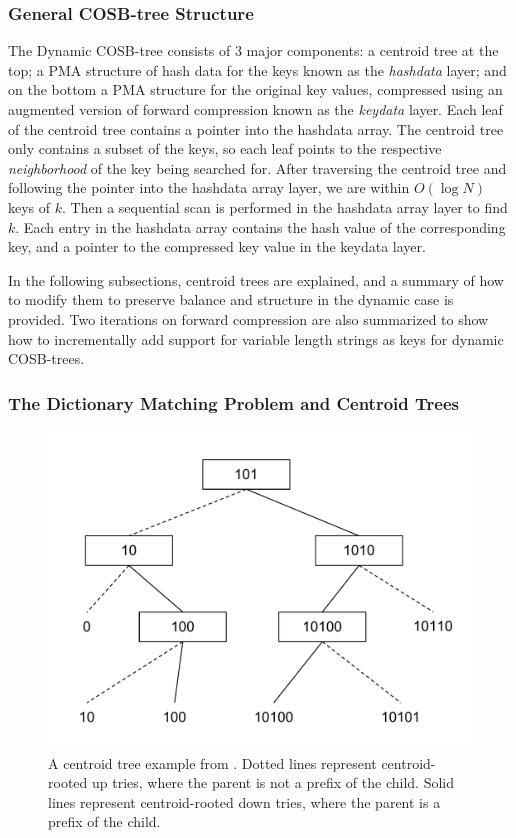 \documentclass{style}
\begin{document}
\subsubsection{General COSB-tree Structure}

The Dynamic COSB-tree consists of 3 major components: a centroid tree at the
top; a PMA structure of hash data for the keys known as
the \emph{hashdata} layer; and on the bottom a PMA structure for the original
key values, compressed using an augmented version of forward compression known as the \emph{keydata} layer. Each leaf of the centroid tree contains a pointer into the hashdata array. The centroid tree only contains a subset of the keys, so each leaf points to the respective \emph{neighborhood} of the key being searched for. After traversing the centroid tree and following the pointer into the hashdata array layer, we are within $O(\log{}N)$ keys of $k$. Then a sequential scan is performed in the hashdata array layer to find $k$. Each entry in the hashdata array contains the hash value of the corresponding key, and a pointer to the compressed key value in the keydata layer.

In the following subsections, centroid trees are explained, and a summary of
how to modify them to preserve balance and structure in the dynamic case is
provided. Two iterations on forward compression are also summarized to show
how to incrementally add support for variable length strings as keys for
dynamic COSB-trees.

\subsubsection{The Dictionary Matching Problem and Centroid Trees} %
\begin{figure}

\begin{center}
	\includegraphics[width=0.8\columnwidth]{figures/centroidtreeexample.pdf}
\end{center}

\caption{A centroid tree example from \cite{BenderFaKu06}. Dotted lines represent centroid-rooted up tries, where the parent is not a prefix of the child. Solid lines represent centroid-rooted down tries, where the parent is a prefix of the child.}
\label{fig:centroid}
\end{figure}
\end{document}
